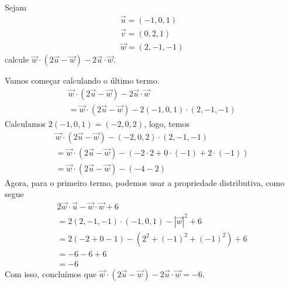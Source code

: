 \begin{exeresol}
  Sejam
  \begin{gather}
    \vec{u} = (-1,0,1)\\
    \vec{v} = (0,2,1)\\
    \vec{w} = (2,-1,-1)
  \end{gather}
  calcule $\vec{w}\cdot\left(2\vec{u}-\vec{w}\right)-2\vec{u}\cdot\vec{w}$.
\end{exeresol}
\begin{resol}
  Vamos começar calculando o último termo.
  \begin{gather}
    \vec{w}\cdot\left(2\vec{u}-\vec{w}\right)-2\vec{u}\cdot\vec{w}\\
    = \vec{w}\cdot\left(2\vec{u}-\vec{w}\right)-2(-1,0,1)\cdot(2,-1,-1)
  \end{gather}
  Calculamos $2(-1,0,1)=(-2,0,2)$, logo, temos
  \begin{gather}
    \vec{w}\cdot\left(2\vec{u}-\vec{w}\right)-(-2,0,2)\cdot(2,-1,-1)\\
    = \vec{w}\cdot\left(2\vec{u}-\vec{w}\right)-(-2\cdot 2 + 0\cdot(-1)+2\cdot(-1))\\
    = \vec{w}\cdot\left(2\vec{u}-\vec{w}\right)-(-4-2)
  \end{gather}
  Agora, para o primeiro termo, podemos usar a propriedade distributiva, como segue
  \begin{gather}
    2\vec{w}\cdot\vec{u} - \vec{w}\cdot\vec{w}+6\\
    = 2(2,-1,-1)\cdot(-1,0,1) - |\vec{w}|^2+6\\
    = 2(-2+0-1)-(2^2+(-1)^2+(-1)^2)+6\\
    = -6 - 6 + 6 \\
    = -6
  \end{gather}
  Com isso, concluímos que $\vec{w}\cdot\left(2\vec{u}-\vec{w}\right)-2\vec{u}\cdot\vec{w} = -6$.
\end{resol}

